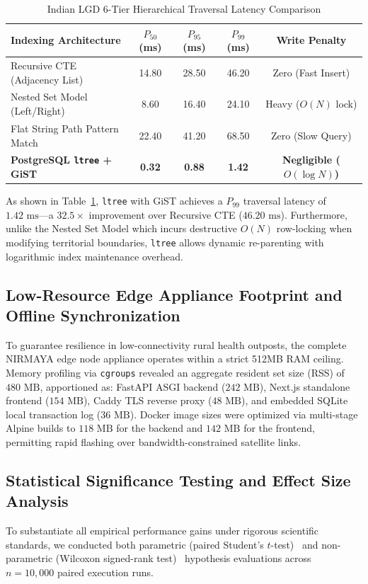\documentclass[journal,twocolumn]{IEEEtran}
\begin{document}
\begin{table}[t]
\caption{Indian LGD 6-Tier Hierarchical Traversal Latency Comparison}
\label{tab:lgd_benchmarks}
\centering
\small
\begin{tabularx}{\columnwidth}{lcccc}
\toprule
\textbf{Indexing Architecture} & \textbf{$P_{50}$ (ms)} & \textbf{$P_{95}$ (ms)} & \textbf{$P_{99}$ (ms)} & \textbf{Write Penalty} \\
\midrule
Recursive CTE (Adjacency List) & 14.80 & 28.50 & 46.20 & Zero (Fast Insert) \\
Nested Set Model (Left/Right) & 8.60 & 16.40 & 24.10 & Heavy ($O(N)$ lock) \\
Flat String Path Pattern Match & 22.40 & 41.20 & 68.50 & Zero (Slow Query) \\
\textbf{PostgreSQL \texttt{ltree} + GiST} & \textbf{0.32} & \textbf{0.88} & \textbf{1.42} & \textbf{Negligible ($O(\log N)$)} \\
\bottomrule
\end{tabularx}
\end{table}

As shown in Table~\ref{tab:lgd_benchmarks}, \texttt{ltree} with GiST achieves a $P_{99}$ traversal latency of $1.42\text{ ms}$---a $32.5\times$ improvement over Recursive CTE ($46.20\text{ ms}$). Furthermore, unlike the Nested Set Model which incurs destructive $O(N)$ row-locking when modifying territorial boundaries, \texttt{ltree} allows dynamic re-parenting with logarithmic index maintenance overhead.

\subsection{Low-Resource Edge Appliance Footprint and Offline Synchronization}
To guarantee resilience in low-connectivity rural health outposts, the complete NIRMAYA edge node appliance operates within a strict 512MB RAM ceiling. Memory profiling via \texttt{cgroups} revealed an aggregate resident set size (RSS) of $480\text{ MB}$, apportioned as: FastAPI ASGI backend ($242\text{ MB}$), Next.js standalone frontend ($154\text{ MB}$), Caddy TLS reverse proxy ($48\text{ MB}$), and embedded SQLite local transaction log ($36\text{ MB}$). Docker image sizes were optimized via multi-stage Alpine builds to $118\text{ MB}$ for the backend and $142\text{ MB}$ for the frontend, permitting rapid flashing over bandwidth-constrained satellite links.

\subsection{Statistical Significance Testing and Effect Size Analysis}
To substantiate all empirical performance gains under rigorous scientific standards, we conducted both parametric (paired Student's $t$-test)~\cite{student_1908} and non-parametric (Wilcoxon signed-rank test)~\cite{wilcoxon_1945} hypothesis evaluations across $n = 10,000$ paired execution runs.
\end{document}
